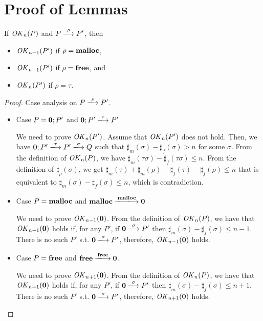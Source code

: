 \section{Proof of Lemmas}
\label{sec:proof}

\begin{lemma}
\label{lem:okPreserved}
If \(\mathit{OK}_n(P)\) and \(P \xlongrightarrow{\rho} P'\), then
\begin{itemize}
\item \(\mathit{OK}_{n-1}(P')\) if \(\rho = \mathbf{malloc}\),
\item \(\mathit{OK}_{n+1}(P')\) if \(\rho = \mathbf{free}\), and
\item \(\mathit{OK}_n(P')\) if \(\rho = \tau\).
\end{itemize}
\end{lemma}
\begin{proof}

Case analysis on \(P \xlongrightarrow{\rho} P'\).

\begin{itemize}
\item Case $P = \mathbf{0};P'$ and \(\TSKIP;P' \xlongrightarrow{\tau} P'\)

  We need to prove \(\mathit{OK}_n(P')\).  Assume that \(\mathit{OK}_n(P')\) does not
  hold. Then, we have \(\TSKIP;P' \xlongrightarrow{\tau} P'
  \xlongrightarrow{\sigma} Q\) such that \(\sharp_{m}(\sigma) -
  \sharp_{f}(\sigma) > n\) for some \(\sigma\).  From the definition
  of \(\mathit{OK}_n(P)\), we have \(\sharp_m(\tau\sigma) - \sharp_f(\tau
  \sigma) \le n \).  From the definition of \(\sharp_\rho(\sigma)\),
  we get \(\sharp_m(\tau) + \sharp_m(\rho) - \sharp_f(\tau) -
  \sharp_f(\rho) \le n\) that is equivalent to \(\sharp_m(\sigma) -
  \sharp_f(\sigma) \le n\), which is contradiction.

\item Case $P = \mathbf{malloc}$ and \(\Malloc
  \xlongrightarrow{\Malloc} \TSKIP\)

  We need to prove \(\mathit{OK}_{n-1}(\mathbf{0})\).  From the definition of
  \(\mathit{OK}_n(P)\), we have that \(\mathit{OK}_{n-1}(\mathbf{0})\) holds if, for any
  \(P'\), if \(\TSKIP \xlongrightarrow{\sigma} P'\) then
  \(\sharp_m(\sigma) - \sharp_f(\sigma) \le n - 1\). There is no such \(P'\) s.t. \(\TSKIP
  \xlongrightarrow{\sigma} P'\), therefore, \(\mathit{OK}_{n-1}(\mathbf{0})\) holds.

  \item Case $P = \mathbf{free}$ and \(\Free \xlongrightarrow{\Free} \TSKIP\).

    We need to prove \(\mathit{OK}_{n+1}(\mathbf{0})\).  From the definition of
  \(\mathit{OK}_n(P)\), we have that \(\mathit{OK}_{n+1}(\mathbf{0})\) holds if, for any
  \(P'\), if \(\TSKIP \xlongrightarrow{\sigma} P'\) then
  \(\sharp_m(\sigma) - \sharp_f(\sigma) \le n + 1\). There is no such \(P'\) s.t. \(\TSKIP
  \xlongrightarrow{\sigma} P'\), therefore, \(\mathit{OK}_{n+1}(\mathbf{0})\) holds.


\end{itemize}
\end{proof}
